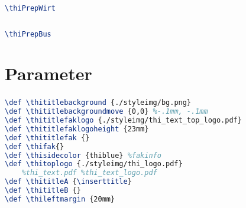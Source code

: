 \documentclass[aspectratio=169]{beamer}
\begin{document}
\begin{frame}[fragile]
    \frametitle{\thifak}
    \begin{lstlisting}[language=TeX]
        \thiPrepWirt
    \end{lstlisting}
\end{frame}

\thiDefaults
\thiPrepBus
\subsection{\thifak}
\def \thititleB {\thifak}
\maketitle

\begin{frame}[fragile]
    \frametitle{\thifak}
    \begin{lstlisting}[language=TeX]
        \thiPrepBus
    \end{lstlisting}
\end{frame}

\thiDefaults
\section{Parameter}
\begin{frame}[fragile]
    \frametitle{\secname}
    \begin{lstlisting}[language=TeX]
\def \thititlebackground {./styleimg/bg.png}
\def \thititlebackgroundmove {0,0} %-.1mm, -.1mm
\def \thititlefaklogo {./styleimg/thi_text_top_logo.pdf}
\def \thititlefaklogoheight {23mm}
\def \thititlefak {}
\def \thifak{}
\def \thisidecolor {thiblue} %fakinfo
\def \thitoplogo {./styleimg/thi_logo.pdf}
    %thi_text.pdf %thi_text_logo.pdf
\def \thititleA {\inserttitle}
\def \thititleB {}
\def \thileftmargin {20mm} 
    \end{lstlisting}
\end{frame}
\end{document}
